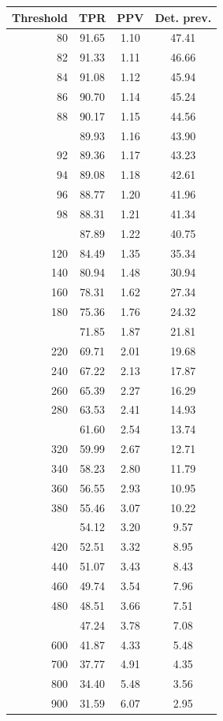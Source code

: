 \documentclass[12pt]{article}
\begin{document}
\begin{minipage}{0.5\textwidth}\small
\begin{tabular}{rccc}
\toprule
\textbf{Threshold} & \textbf{TPR} 
& \textbf{PPV} & \textbf{Det. prev.} \\
\midrule
     80 & 91.65 & 1.10 & 47.41 \\ 
     82 & 91.33 & 1.11 & 46.66 \\ 
     84 & 91.08 & 1.12 & 45.94 \\ 
     86 & 90.70 & 1.14 & 45.24 \\ 
     88 & 90.17 & 1.15 & 44.56 \\ \addlinespace
     90 & 89.93 & 1.16 & 43.90 \\ 
     92 & 89.36 & 1.17 & 43.23 \\ 
     94 & 89.08 & 1.18 & 42.61 \\ 
     96 & 88.77 & 1.20 & 41.96 \\ 
     98 & 88.31 & 1.21 & 41.34 \\ \addlinespace
    100 & 87.89 & 1.22 & 40.75 \\ 
    120 & 84.49 & 1.35 & 35.34 \\ 
    140 & 80.94 & 1.48 & 30.94 \\ 
    160 & 78.31 & 1.62 & 27.34 \\ 
    180 & 75.36 & 1.76 & 24.32 \\ \addlinespace
    200 & 71.85 & 1.87 & 21.81 \\ 
    220 & 69.71 & 2.01 & 19.68 \\ 
    240 & 67.22 & 2.13 & 17.87 \\ 
    260 & 65.39 & 2.27 & 16.29 \\ 
    280 & 63.53 & 2.41 & 14.93 \\ \addlinespace
    300 & 61.60 & 2.54 & 13.74 \\ 
    320 & 59.99 & 2.67 & 12.71 \\ 
    340 & 58.23 & 2.80 & 11.79 \\ 
    360 & 56.55 & 2.93 & 10.95 \\ 
    380 & 55.46 & 3.07 & 10.22 \\ \addlinespace
    400 & 54.12 & 3.20 & 9.57 \\ 
    420 & 52.51 & 3.32 & 8.95 \\ 
    440 & 51.07 & 3.43 & 8.43 \\ 
    460 & 49.74 & 3.54 & 7.96 \\ 
    480 & 48.51 & 3.66 & 7.51 \\ \addlinespace
    500 & 47.24 & 3.78 & 7.08 \\ 
    600 & 41.87 & 4.33 & 5.48 \\ 
    700 & 37.77 & 4.91 & 4.35 \\  
    800 & 34.40 & 5.48 & 3.56 \\ 
    900 & 31.59 & 6.07 & 2.95 \\
\bottomrule
\end{tabular}

\end{minipage}
\end{document}
